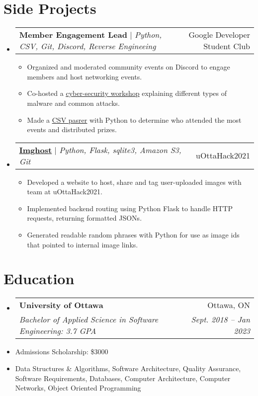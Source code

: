 \documentclass[letterpaper,11pt]{article}
\makeatletter
\newcommand{\resumeItem}[1]{
  \item\small{
    {#1 \vspace{-2pt}}
  }
}
\newcommand{\resumeSubheading}[4]{
  \vspace{-2pt}\item
    \begin{tabular*}{0.97\textwidth}[t]{l@{\extracolsep{\fill}}r}
      \textbf{#1} & #2 \\
      \textit{\small#3} & \textit{\small #4} \\
    \end{tabular*}\vspace{-7pt}
}
\newcommand{\resumeProjectHeading}[2]{
    \item
    \begin{tabular*}{0.97\textwidth}{l@{\extracolsep{\fill}}r}
      \small#1 & #2 \\
    \end{tabular*}\vspace{-7pt}
}
\newcommand{\resumeSubHeadingListStart}{\begin{itemize}[leftmargin=0.15in, label={}]}
\newcommand{\resumeSubHeadingListEnd}{\end{itemize}}
\newcommand{\resumeItemListStart}{\begin{itemize}}
\newcommand{\resumeItemListEnd}{\end{itemize}\vspace{-5pt}}
\makeatother
\begin{document}
\section{Side Projects}
    \resumeSubHeadingListStart
      \resumeProjectHeading
          {\textbf{Member Engagement Lead} $|$ \emph{Python, CSV, Git, Discord, Reverse Engineeing}}{Google Developer Student Club}
          \resumeItemListStart
            \resumeItem{Organized and moderated community events on Discord to engage members and host networking events.}
            \resumeItem{Co-hosted a \href{https://www.youtube.com/watch?v=CBb6tFfmoBI}{\underline{cyber-security workshop}} explaining different types of malware and common attacks.}
            \resumeItem{Made a \href{https://github.com/GregMitch/Attendance-Checker}{\underline{CSV pasrer}} with Python to determine who attended the most events and distributed prizes.}
          \resumeItemListEnd
      \resumeProjectHeading
          {\textbf{\href{https://github.com/The-Homiesexuals/imghost/commits/master?author=GregMitch}{\underline{Imghost}}} $|$ \emph{Python, Flask, sqlite3, Amazon S3, Git}}{uOttaHack2021}
          \resumeItemListStart
            \resumeItem{Developed a website to host, share and tag user-uploaded images with team at uOttaHack2021.}
            \resumeItem{Implemented backend routing using Python Flask to handle HTTP requests, returning formatted JSONs.}
            \resumeItem{Generated readable random phrases with Python for use as image ids that pointed to internal image links.}
          \resumeItemListEnd
    \resumeSubHeadingListEnd


\section{Education}
\resumeSubHeadingListStart
  \resumeSubheading
    {University of Ottawa}{Ottawa, ON}
    {Bachelor of Applied Science in Software Engineering: 3.7 GPA}{Sept. 2018 -- Jan 2023}
\resumeSubHeadingListEnd
\resumeItemListStart
  \resumeItem{Admissions Scholarship: \$3000}
  \resumeItem{Data Structures \& Algorithms, Software Architecture, Quality Assurance, Software Requirements, Databases, Computer Architecture, Computer Networks, Object Oriented Programming}
\resumeItemListEnd

\end{document}
